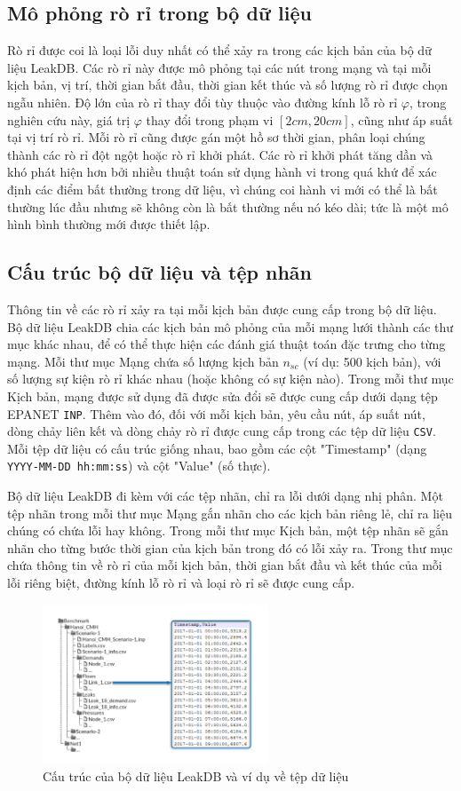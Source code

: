 \subsection{Mô phỏng rò rỉ trong bộ dữ liệu}

Rò rỉ được coi là loại lỗi duy nhất có thể xảy ra trong các kịch bản của bộ dữ liệu LeakDB. Các rò rỉ này được mô phỏng tại các nút trong mạng và tại mỗi kịch bản, vị trí, thời gian bắt đầu, thời gian kết thúc và số lượng rò rỉ được chọn ngẫu nhiên. Độ lớn của rò rỉ thay đổi tùy thuộc vào đường kính lỗ rò rỉ $\varphi$, trong nghiên cứu này, giá trị $\varphi$ thay đổi trong phạm vi $[2cm, 20cm]$, cũng như áp suất tại vị trí rò rỉ. Mỗi rò rỉ cũng được gán một hồ sơ thời gian, phân loại chúng thành các rò rỉ đột ngột hoặc rò rỉ khởi phát. Các rò rỉ khởi phát tăng dần và khó phát hiện hơn bởi nhiều thuật toán sử dụng hành vi trong quá khứ để xác định các điểm bất thường trong dữ liệu, vì chúng coi hành vi mới có thể là bất thường lúc đầu nhưng sẽ không còn là bất thường nếu nó kéo dài; tức là một mô hình bình thường mới được thiết lập.

\subsection{Cấu trúc bộ dữ liệu và tệp nhãn}

Thông tin về các rò rỉ xảy ra tại mỗi kịch bản được cung cấp trong bộ dữ liệu. Bộ dữ liệu LeakDB chia các kịch bản mô phỏng của mỗi mạng lưới thành các thư mục khác nhau, để có thể thực hiện các đánh giá thuật toán đặc trưng cho từng mạng. Mỗi thư mục Mạng chứa số lượng kịch bản $n_{sc}$ (ví dụ: 500 kịch bản), với số lượng sự kiện rò rỉ khác nhau (hoặc không có sự kiện nào). Trong mỗi thư mục Kịch bản, mạng được sử dụng đã được sửa đổi sẽ được cung cấp dưới dạng tệp EPANET \texttt{INP}. Thêm vào đó, đối với mỗi kịch bản, yêu cầu nút, áp suất nút, dòng chảy liên kết và dòng chảy rò rỉ được cung cấp trong các tệp dữ liệu \texttt{CSV}. Mỗi tệp dữ liệu có cấu trúc giống nhau, bao gồm các cột "Timestamp" (dạng \texttt{YYYY-MM-DD hh:mm:ss}) và cột "Value" (số thực).

Bộ dữ liệu LeakDB đi kèm với các tệp nhãn, chỉ ra lỗi dưới dạng nhị phân. Một tệp nhãn trong mỗi thư mục Mạng gắn nhãn cho các kịch bản riêng lẻ, chỉ ra liệu chúng có chứa lỗi hay không. Trong mỗi thư mục Kịch bản, một tệp nhãn sẽ gắn nhãn cho từng bước thời gian của kịch bản trong đó có lỗi xảy ra. Trong thư mục chứa thông tin về rò rỉ của mỗi kịch bản, thời gian bắt đầu và kết thúc của mỗi lỗi riêng biệt, đường kính lỗ rò rỉ và loại rò rỉ sẽ được cung cấp.

\begin{figure}[h]
\centering
\includegraphics[width=0.6\textwidth]{image/section5_2/structure_of_leak_db.PNG}
\caption{Cấu trúc của bộ dữ liệu LeakDB và ví dụ về tệp dữ liệu}
\end{figure}